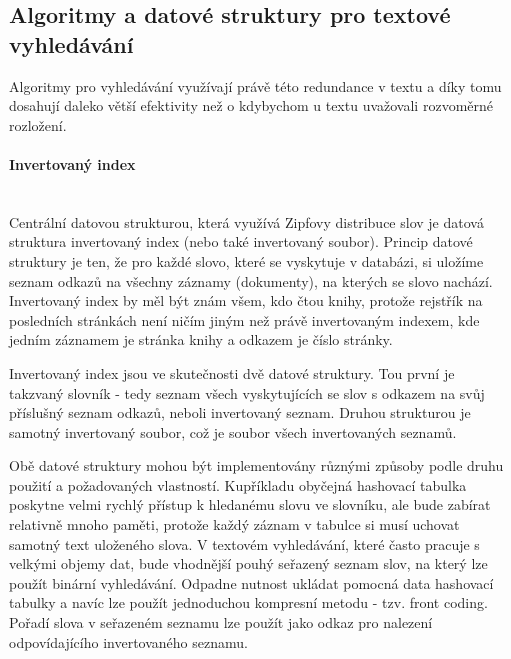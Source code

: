 \documentclass[12pt]{article}
\begin{document}
\subsection{Algoritmy a datové struktury pro textové vyhledávání}
Algoritmy pro vyhledávání využívají právě této redundance v textu a díky tomu
dosahují daleko větší efektivity než o kdybychom u textu uvažovali rozvoměrné
rozložení.

\paragraph{Invertovaný index} \mbox{}\\
Centrální datovou strukturou, která využívá Zipfovy distribuce slov je datová
struktura invertovaný index (nebo také invertovaný soubor). Princip datové
struktury je ten, že pro každé slovo, které se vyskytuje v databázi, si uložíme
seznam odkazů na všechny záznamy (dokumenty), na kterých se slovo nachází.
Invertovaný index by měl být znám všem, kdo čtou knihy, protože rejstřík na
posledních stránkách není ničím jiným než právě invertovaným indexem, kde
jedním záznamem je stránka knihy a odkazem je číslo stránky. 

Invertovaný index jsou ve skutečnosti dvě datové struktury. Tou první je
takzvaný slovník - tedy seznam všech vyskytujících se slov s odkazem na svůj
příslušný seznam odkazů, neboli invertovaný seznam. Druhou strukturou je
samotný invertovaný soubor, což je soubor všech invertovaných seznamů.

Obě datové struktury mohou být implementovány různými způsoby podle druhu
použití a požadovaných vlastností. Kupříkladu obyčejná hashovací tabulka
poskytne velmi rychlý přístup k hledanému slovu ve slovníku, ale bude zabírat
relativně mnoho paměti, protože každý záznam v tabulce si musí uchovat samotný
text uloženého slova. V textovém vyhledávání, které často pracuje s velkými
objemy dat, bude vhodnější pouhý seřazený seznam slov, na který lze použít
binární vyhledávání. Odpadne nutnost ukládat pomocná data hashovací tabulky a
navíc lze použít jednoduchou kompresní metodu - tzv. front coding. Pořadí slova
v seřazeném seznamu lze použít jako odkaz pro nalezení odpovídajícího
invertovaného seznamu.
\end{document}

